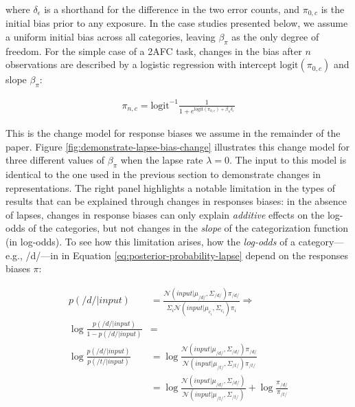 \documentclass[
  11pt,
  english,
  man,floatsintext]{apa6}
\begin{document}
where \(\delta_\epsilon\) is a shorthand for the difference in the two error counts, and \(\pi_{0,c}\) is the initial bias prior to any exposure. In the case studies presented below, we assume a uniform initial bias across all categories, leaving \(\beta_{\pi}\) as the only degree of freedom. For the simple case of a 2AFC task, changes in the bias after \(n\) observations are described by a logistic regression with intercept \(\mathrm{logit}(\pi_{0,c})\) and slope \(\beta_{\pi}\):

\begin{equation}\label{eq:bias-probability}
\begin{split}
\pi_{n,c} = \mathrm{logit}^{-1}\frac{1}{1+ e^{\mathrm{logit}(\pi_{0,c}) + \beta_{\pi} \delta_{\epsilon}}}
\end{split}
\end{equation}

This is the change model for response biases we assume in the remainder of the paper. Figure \ref{fig:demonstrate-lapse-bias-change} illustrates this change model for three different values of \(\beta_\pi\) when the lapse rate \(\lambda=0\). The input to this model is identical to the one used in the previous section to demonstrate changes in representations. The right panel highlights a notable limitation in the types of results that can be explained through changes in responses biases: in the absence of lapses, changes in response biases can only explain \emph{additive} effects on the log-odds of the categories, but not changes in the \emph{slope} of the categorization function (in log-odds). To see how this limitation arises, how the \emph{log-odds} of a category---e.g., /d/---in in Equation \eqref{eq:posterior-probability-lapse} depend on the responses biases \(\pi\):

\begin{equation}\label{eq:posterior-probability-lapse-PR}
\begin{split}
p(/d/ | input) & = \frac{\mathcal{N}\!\left( input | \mu_{/d/}, \Sigma_{/d/} \right) \pi_{/d/}}{\Sigma_i \mathcal{N}\!\left( input | \mu_{c_i}, \Sigma_{c_i}\right) \pi_i} \Rightarrow \\
\log \frac{p(/d/ | input)}{1 - p(/d/ | input)} & =  \\
\log \frac{p(/d/ | input)}{p(/t/ | input)} & =  \log \frac{\mathcal{N}\!\left( input | \mu_{/d/}, \Sigma_{/d/} \right) \pi_{/d/}}{\mathcal{N}\!\left( input | \mu_{/t/}, \Sigma_{/t/} \right) \pi_{/t/}} \\
 & = \log \frac{\mathcal{N}\!\left( input | \mu_{/d/}, \Sigma_{/d/} \right)}{\mathcal{N}\!\left( input | \mu_{/t/}, \Sigma_{/t/} \right)} + \log\frac{\pi_{/d/}}{\pi_{/t/}}
\end{split}
\end{equation}
\end{document}
